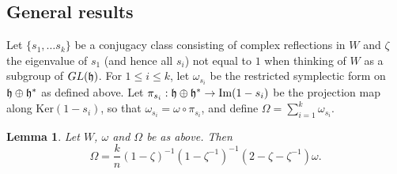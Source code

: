 \documentclass[a4apper,10pt]{amsart}
\newtheorem{lem}[thm]{Lemma}
\theoremstyle{definition}
\numberwithin{thm}{section}
\renewcommand{\Im}{\textrm{Im}}
\renewcommand{\ker}{\textrm{Ker}}
\begin{document}
\subsection{General results}
Let $\{ s_1, \dots s_k \}$ be a conjugacy class consisting of complex reflections in $W$ and $\zeta$ the eigenvalue of $s_1$ (and hence all $s_i$) not equal to $1$ when thinking of $W$ as a subgroup of $GL(\frak{h})$. For $1 \le i\le k$, let $\omega_{s_i}$ be the restricted symplectic form on $\frak{h} \oplus \frak{h}^*$ as defined above. Let $\pi_{s_i} : \frak{h} \oplus \frak{h}^* \rightarrow \Im ( 1 - s_i )$ be the projection map along $\ker (1 - s_i)$, so that $\omega_{s_i} = \omega \circ \pi_{s_i}$, and define $\Omega = \sum_{i = 1}^k \omega_{s_i}$. 

\begin{lem}\label{lem:nondeg}
Let $W$, $\omega$ and $\Omega$ be as above. Then 
\begin{displaymath}
\Omega = \frac{k}{n}(1 - \zeta)^{-1}(1 - \zeta^{-1})^{-1}(2 - \zeta - \zeta^{-1}) \omega.
\end{displaymath}
\end{lem}
\end{document}
